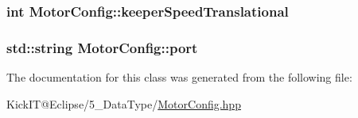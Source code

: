 \subsubsection[{\texorpdfstring{keeper\+Speed\+Translational}{keeperSpeedTranslational}}]{\setlength{\rightskip}{0pt plus 5cm}int Motor\+Config\+::keeper\+Speed\+Translational}\hypertarget{class_motor_config_a2d71d5ba5fa077680a8e032654f3e963}{}\label{class_motor_config_a2d71d5ba5fa077680a8e032654f3e963}
\subsubsection[{\texorpdfstring{port}{port}}]{\setlength{\rightskip}{0pt plus 5cm}std\+::string Motor\+Config\+::port}\hypertarget{class_motor_config_a8c20151468f9399aaa7311b421ea16da}{}\label{class_motor_config_a8c20151468f9399aaa7311b421ea16da}


The documentation for this class was generated from the following file\+:\begin{DoxyCompactItemize}
\item 
Kick\+I\+T@\+Eclipse/5\+\_\+\+Data\+Type/\hyperlink{_motor_config_8hpp}{Motor\+Config.\+hpp}\end{DoxyCompactItemize}
